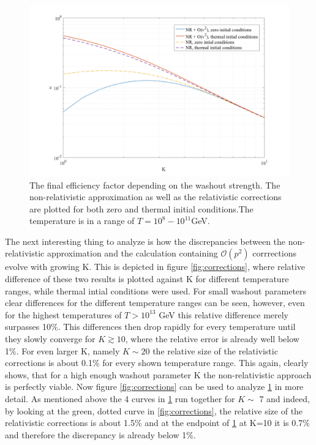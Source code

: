\begin{figure}[H]
	\centering
	\includegraphics[width=\linewidth]{Images/efficiency}
	\caption{The final efficiency factor depending on the washout strength. The non-relativistic approximation as well as the relativistic corrections are plotted for both zero and thermal initial conditions.The temperature is in a range of $T=10^{8}-10^{11}$GeV.}
	\label{fig:efficiency}
\end{figure}
The next interesting thing to analyze is how the discrepancies between the non-relativistic approximation and the calculation containing $\mathcal{O}(p^2)$ corrrections evolve with growing K. This is depicted in figure \ref{fig:corrections}, where relative difference of these two results is plotted against K for different temperature ranges, while thermal intial conditions were used. For small washout parameters clear differences for the different temperature ranges can be seen, however, even for the highest temperatures of $T>10^{13}$ GeV this relative difference merely surpasses 10\%. This differences then drop rapidly for every temperature until they slowly converge for $K\gtrsim10$, where the relative error is already well below 1\%. For even larger K, namely $K\sim20$ the relative size of the relativistic corrections is about 0.1\% for every shown temperature range. This again, clearly shows, that for a high enough washout parameter K the non-relativistic approach is perfectly viable. \newline \indent
Now figure \ref{fig:corrections} can be used to analyze \ref{fig:efficiency} in more detail. As mentioned above the 4 curves in \ref{fig:efficiency} run together for $K\sim$ 7 and indeed, by looking at the green, dotted curve in \ref{fig:corrections}, the relative size of the relativistic corrections is about 1.5\% and at the endpoint of \ref{fig:efficiency} at K=10 it is 0.7\% and therefore the discrepancy is already below 1\%.
